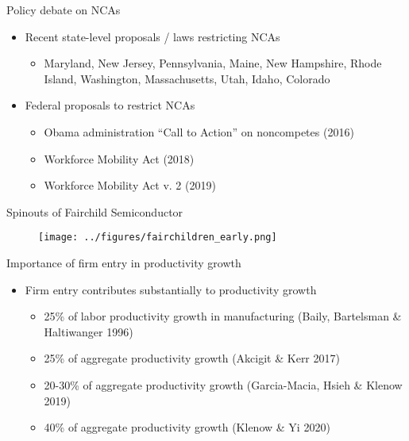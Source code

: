 \documentclass[english,usenames,dvipsnames]{beamer}
\begin{document}
\begin{frame}{Policy debate on NCAs}
	\label{motivation:policyDebateOnNCAs}
	\hyperlink{motivation_1}{}
	\begin{itemize}
		\item Recent state-level proposals / laws restricting NCAs
		\begin{itemize}
			\item Maryland, New Jersey, Pennsylvania, Maine, New Hampshire, Rhode Island, Washington, Massachusetts, Utah, Idaho, Colorado
		\end{itemize}
		\item Federal proposals to restrict NCAs
		\begin{itemize}
			\item Obama administration ``Call to Action'' on noncompetes (2016)
			\item Workforce Mobility Act (2018)
			\item Workforce Mobility Act v. 2 (2019)
		\end{itemize}
	\end{itemize}
\end{frame}

\begin{frame}{Spinouts of Fairchild Semiconductor}\label{motivation:Fairchildren}
\hyperlink{motivation:importanceOfSpinouts}{}
\begin{figure}
	\texttt{[image: ../figures/fairchildren\_early.png]}
\end{figure}
\end{frame}



\begin{frame}{Importance of firm entry in productivity growth}\label{motivation:importance_of_firm_entry}
	\hyperlink{motivation_background}{}
	\begin{itemize}
		\item Firm entry contributes substantially to productivity growth
		\begin{itemize}
			\item 25\% of labor productivity growth in manufacturing (Baily, Bartelsman \& Haltiwanger 1996)
			\item 25\% of aggregate productivity growth (Akcigit \& Kerr 2017)
			\item 20-30\% of aggregate productivity growth (Garcia-Macia, Hsieh \& Klenow 2019)
			\item 40\% of aggregate productivity growth (Klenow \& Yi 2020)
		\end{itemize}
	\end{itemize}
\end{frame}
\end{document}

